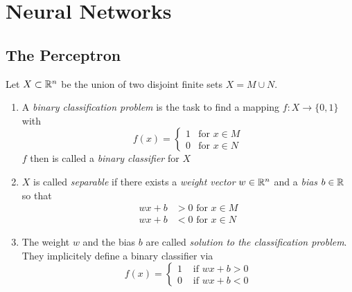 
\newpage
\section{Neural Networks}

\subsection{The Perceptron}

\begin{definition}
	Let \( X \subset \mathbb{R}^n \) be the union of two disjoint finite sets \( X = M \cup N \).
    \begin{enumerate}
		\item A \emph{binary classification problem} is the task to find a mapping \( f: X \to \{ 0, 1 \} \) with
			\[
		        f(x) = \left\{
		            \begin{array}{ll}
		                1& \text{for } x \in M \\
		                0& \text{for } x \in N
		            \end{array}
			\]
			\( f \) then is called a \emph{binary classifier} for \( X \)
		\item \( X \) is called \emph{separable} if there exists a \emph{weight vector} \( w \in \mathbb{R}^n \) 
			and a \emph{bias} \( b \in \mathbb{R} \) so that
				\[
					\begin{split}
						wx + b & > 0 \text{ for } x \in M \\
						wx + b & < 0 \text{ for } x \in N
					\end{split}
				\]
		\item The weight \( w \) and the bias \( b \) are called \emph{solution to the classification problem}. 
		    They implicitely define a binary classifier via
				\[
		        f(x) = \left\{
		            \begin{array}{ll}
		                1& \text{ if } wx + b > 0 \\
		                0& \text{ if } wx + b < 0
		            \end{array}
				\]
    \end{enumerate}
\end{definition}
\bigskip


